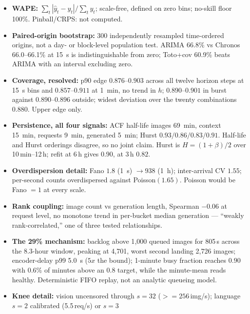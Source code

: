 \documentclass[11pt,a4paper]{article}
\def\times{x}\def\rho{rho}\def\approx{~}\def\leq{<=}\def\geq{>=}%
\def\emph#1{#1}\def\texttt#1{#1}%
\begin{document}
\begin{itemize}
  tiling); common span 167 origins at \SI{1}{\minute} up to \num{49727} at
  \SI{1}{\second}; index-thresholded, so 98.7\% of the week at
  \SI{1}{\second} but only the final \SI{33.4}{\hour} at \SI{1}{\minute}.
  Within-column comparisons only.
\item \textbf{WAPE:} $\sum_t|\hat y_t - y_t|/\sum_t y_t$; scale-free, defined
  on zero bins; no-skill floor 100\%. Pinball/CRPS: not computed.
\item \textbf{Paired-origin bootstrap:} 300 independently resampled
  time-ordered origins, not a day- or block-level population test. ARIMA
  66.8\% vs Chronos 66.0--66.1\% at \SI{15}{\second} is indistinguishable
  from zero; Toto+cov 60.9\% beats ARIMA with an interval excluding zero.
\item \textbf{Coverage, resolved:} p90 edge $0.876$--$0.903$ across all twelve
  horizon steps at \SI{15}{\second} bins and $0.857$--$0.911$ at
  \SI{1}{\minute}, no trend in $h$; $0.890$--$0.901$ in burst against
  $0.890$--$0.896$ outside; widest deviation over the twenty combinations
  $0.880$. Upper edge only.
\item \textbf{Persistence, all four signals:} ACF half-life images
  \SI{69}{\minute}, context \SI{15}{\minute}, requests \SI{9}{\minute},
  generated \SI{5}{\minute}; Hurst $0.93/0.86/0.83/0.91$. Half-life and
  Hurst orderings disagree, so no joint claim. Hurst is
  $H=(1{+}\beta)/2$ over 10\,min--12\,h; refit at 6\,h gives $0.90$, at 3\,h
  $0.82$.
\item \textbf{Overdispersion detail:} Fano $1.8$ (\SI{1}{\second}) $\to 938$
  (\SI{1}{\hour}); inter-arrival CV $1.55$; per-second counts overdispersed
  against Poisson$(1.65)$. Poisson would be Fano $=1$ at every scale.
\item \textbf{Rank coupling:} image count vs generation length, Spearman
  $-0.06$ at request level, no monotone trend in per-bucket median
  generation --- ``weakly rank-correlated,'' one of three tested
  relationships.
\item \textbf{The 29\% mechanism:} backlog above 1{,}000 queued images for
  805\,s across the 8.3-hour window, peaking at 4{,}701, worst second landing
  2{,}726 images; encoder-delay p99 \SI{5.0}{\second} ($5\times$ the bound);
  1-minute busy fraction reaches $0.90$ with 0.6\% of minutes above an $0.8$
  target, while the minute-mean reads healthy. Deterministic FIFO replay,
  \emph{not} an analytic queueing model.
\item \textbf{Knee detail:} vision uncensored through $s{=}32$
  ($\geq 256$\,img/s); language $s{=}2$ calibrated (5.5\,req/s) or $s{=}3$

\end{itemize}
\end{document}
